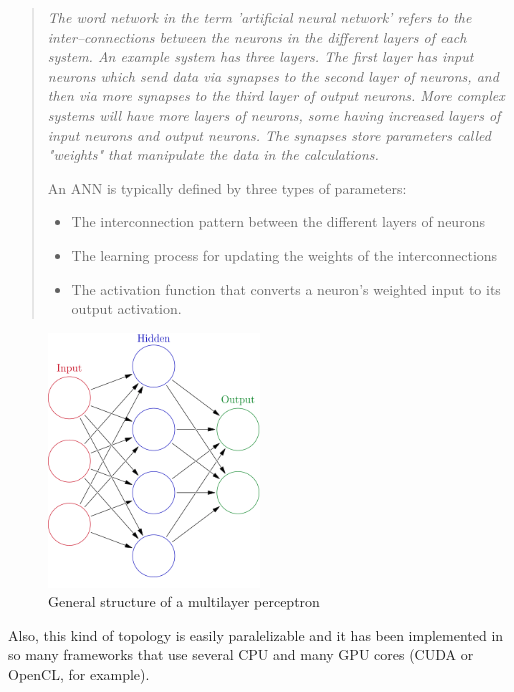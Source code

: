 \documentclass[a4paper,openany,oneside,12pt]{book}
\begin{document}
\begin{quote}
\em The word network in the term 'artificial neural network' refers to the inter–connections between the neurons in the different layers of each system. An example system has three layers. The first layer has input neurons which send data via synapses to the second layer of neurons, and then via more synapses to the third layer of output neurons. More complex systems will have more layers of neurons, some having increased layers of input neurons and output neurons. The synapses store parameters called "weights" that manipulate the data in the calculations.

An ANN is typically defined by three types of parameters:
\begin{itemize}
\item The interconnection pattern between the different layers of neurons
\item The learning process for updating the weights of the interconnections
\item The activation function that converts a neuron's weighted input to its output activation.
\cite{wiki:ann}
\end{itemize}
\end{quote}



\begin{figure}
\centering
\includegraphics[width=0.5\textwidth]{img/Colored_neural_network.png} 
\caption{General structure of a multilayer perceptron} \label{fig:neuralnet}
\end{figure}

Also, this kind of topology is easily paralelizable and it has been implemented in so many frameworks that use several CPU and many GPU cores (CUDA or OpenCL, for example).
\end{document}
